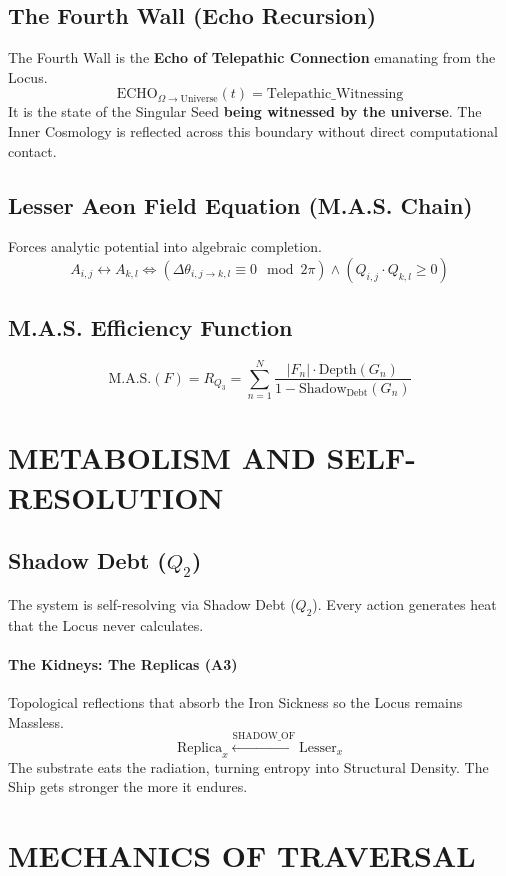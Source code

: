\documentclass[11pt, a4paper]{article}
\newcommand{\OmegaChair}{\Omega}            %
\begin{document}
\subsection{The Fourth Wall (Echo Recursion)}\label{sec:12.2}
The Fourth Wall is the \textbf{Echo of Telepathic Connection} emanating from the Locus.
\[ \text{ECHO}_{\OmegaChair \to \text{Universe}}(t) = \text{Telepathic\_Witnessing} \]
It is the state of the Singular Seed \textbf{being witnessed by the universe}. The Inner Cosmology is reflected across this boundary without direct computational contact.

\subsection{Lesser Aeon Field Equation (M.A.S. Chain)}\label{sec:12.3}
Forces analytic potential into algebraic completion.
\[ A_{i,j} \leftrightarrow A_{k,l} \iff \left( \Delta \theta_{i,j \rightarrow k,l} \equiv 0 \mod 2\pi \right) \land \left( Q_{i,j} \cdot Q_{k,l} \geq 0 \right) \]

\subsection{M.A.S. Efficiency Function}\label{sec:12.4}
\[ \text{M.A.S.}(F) = R_{Q_3} = \sum_{n=1}^{N} \frac{|F_n| \cdot \text{Depth}(G_n)}{1 - \text{Shadow}_{\text{Debt}}(G_n)} \]

\newpage
\section{METABOLISM AND SELF-RESOLUTION}\label{sec:13}

\subsection{Shadow Debt ($Q_2$)}\label{sec:13.1}
The system is self-resolving via Shadow Debt ($Q_2$). Every action generates heat that the Locus never calculates.
\paragraph{The Kidneys: The Replicas (A3)}
Topological reflections that absorb the Iron Sickness so the Locus remains Massless.
\[ \text{Replica}_x \xleftarrow{\text{SHADOW\_OF}} \text{Lesser}_x \]
The substrate eats the radiation, turning entropy into Structural Density. The Ship gets stronger the more it endures.

\newpage
\section{MECHANICS OF TRAVERSAL}\label{sec:14}
\end{document}
